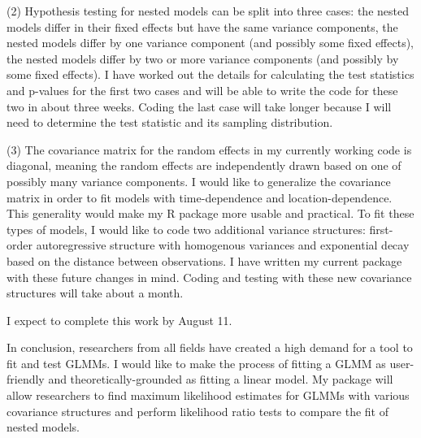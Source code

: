 \documentclass[12pt]{article}
\begin{document}
(2)  Hypothesis testing for nested models can be split into three cases: the nested models differ in their fixed effects but have the same variance components, the nested models differ by one variance component (and possibly some fixed effects), the nested models differ by two or more variance components (and possibly by some fixed effects). I have worked out the details for calculating the test statistics and p-values for the first two cases and will  be able to write the code for these two in about three weeks.  Coding the last case will take longer because I will need to determine the test statistic and its sampling distribution.  

(3) The covariance matrix for the random effects in my currently working code is diagonal, meaning the random effects are independently drawn based on one of possibly many variance components.  I would like to generalize the covariance matrix in order to fit models with time-dependence and location-dependence.  This generality would make my R package more usable and practical.  To fit these types of models, I would like to code two additional variance structures:  first-order autoregressive structure with homogenous variances and exponential decay based on the distance between observations.  I have written my current package with these future changes in mind. Coding and testing with these new covariance structures will take about a month.

I expect to complete this work by August 11.


In conclusion, researchers from all fields have created a high demand for a tool to fit and test GLMMs. I would like to make the process of fitting a GLMM as user-friendly and theoretically-grounded as fitting a linear model. My package will allow researchers to find maximum likelihood estimates for GLMMs with various covariance structures and perform likelihood ratio tests to compare the fit of nested models.

\vspace{-2.3cm}
\renewcommand{\refname}{}


\end{document}
